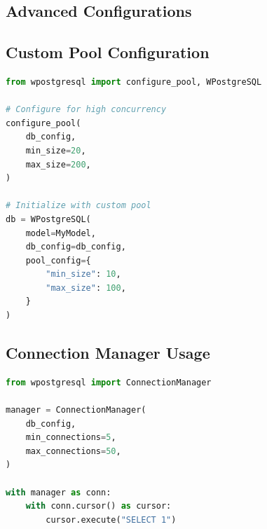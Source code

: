 \documentclass[12pt,a4paper]{report}
\begin{document}
\begin{appendices}

	\chapter{Advanced Configurations}

	\section{Custom Pool Configuration}

	\begin{lstlisting}[language=Python, caption=Advanced Pool Config]
from wpostgresql import configure_pool, WPostgreSQL

# Configure for high concurrency
configure_pool(
    db_config,
    min_size=20,
    max_size=200,
)

# Initialize with custom pool
db = WPostgreSQL(
    model=MyModel,
    db_config=db_config,
    pool_config={
        "min_size": 10,
        "max_size": 100,
    }
)
\end{lstlisting}

	\section{Connection Manager Usage}

	\begin{lstlisting}[language=Python, caption=Connection Manager]
from wpostgresql import ConnectionManager

manager = ConnectionManager(
    db_config,
    min_connections=5,
    max_connections=50,
)

with manager as conn:
    with conn.cursor() as cursor:
        cursor.execute("SELECT 1")
\end{lstlisting}

\end{appendices}
\end{document}
